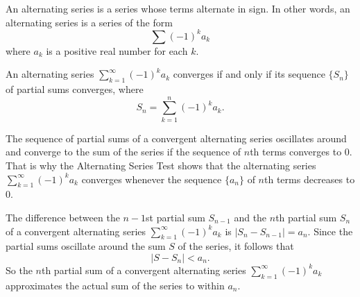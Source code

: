 \begin{summary}
\item An alternating series is a series whose terms alternate in sign. In other words, an alternating series is a series of the form
\[\sum (-1)^ka_k\]
where $a_k$ is a positive real number for each $k$.
\item An alternating series $\sum_{k=1}^{\infty} (-1)^ka_k$ converges if and only if its sequence $\{S_n\}$ of partial sums converges, where
\[S_n = \sum_{k=1}^{n} (-1)^ka_k.\]
\item The sequence of partial sums of a convergent alternating series oscillates around and converge to the sum of the series if the sequence of $n$th terms converges to 0. That is why the Alternating Series Test shows that the alternating series $\sum_{k=1}^{\infty} (-1)^ka_k$ converges whenever the sequence $\{a_n\}$ of $n$th terms decreases to 0.
\item The difference between the $n-1$st partial sum $S_{n-1}$ and the $n$th partial sum $S_n$ of a convergent alternating series $\sum_{k=1}^{\infty} (-1)^ka_k$ is $|S_n - S_{n-1}| = a_n$. Since the partial sums oscillate around the sum $S$ of the series, it follows that
\[|S - S_n| < a_n.\]
So the $n$th partial sum of a convergent alternating series $\sum_{k=1}^{\infty} (-1)^ka_k$ approximates the actual sum of the series to within $a_n$.
\end{summary}

\nin \hrulefill


\clearpage
